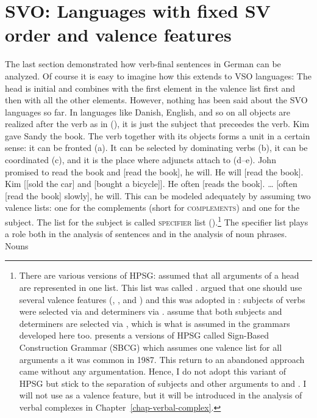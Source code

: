 \section{SVO: Languages with fixed SV order and valence features}
\label{sec-intro-schemata}
\label{sec-intro-spr-comps}

The last section demonstrated how verb-final sentences in German can be analyzed. Of course it is
easy to imagine how this extends to VSO languages: The head is initial and combines with the first
element in the valence list first and then with all the other elements. However, nothing has been
said about the SVO languages so far. In languages like Danish, English, and so on all objects are
realized after the verb as in (), it is just the subject that preceedes the verb.
\ea
Kim gave Sandy the book.
\z
The verb together with its objects forms a unit in a certain sense: it can be fronted (a). It can be
selected by dominating verbs (b), it can be coordinated (c), and it is the place where adjuncts attach to (d--e).
\eal
\ex John promised to read the book and [read the book], he will.
\ex He will [read the book].
\ex Kim [[sold the car] and [bought a bicycle]]. 
\ex He often [reads the book].
\ex \ldots{} [often [read the book] slowly], he will.
\zl
This can be modeled adequately by assuming two valence lists: one for the complements (\comps short for \textsc{complements}) and
one for the subject. The list for the subject is called \textsc{specifier} list
(\spr).\footnote{%
  There are various versions of HPSG: \citet[Chapter~3.2]{ps} assumed that all arguments of a head are
  represented in one list. This list was called \subcatl. \citet{Borsley87a} argued that one should
  use several valence features (\subj, \spr, and \comps) and this was adopted in
  : subjects of verbs were selected via \subj and determiners via
  \spr. \citet*[Chapter~4.3]{SWB2003a} assume that both subjects and determiners are selected via \spr, which is
  what is assumed in the grammars developed here too. \citet[Section~3.3]{Sag2012a} presents a versions of HPSG
  called Sign-Based Construction Grammar (SBCG) which assumes one valence list for all arguments a
  it was common in 1987. This return to an abandoned approach came without any argumentation. Hence, I do not adopt this
  variant of HPSG but stick to the separation of subjects and other arguments to \spr and \comps. I
  will not use \subj as a valence feature, but it will be introduced in the analysis of verbal
  complexes in Chapter~\ref{chap-verbal-complex}.
} The specifier list plays a role both in the analysis of sentences and in the analysis of noun phrases. Nouns
